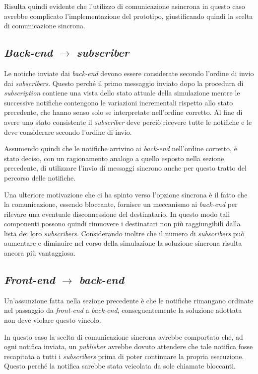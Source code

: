Risulta quindi evidente che l'utilizzo di comunicazione asincrona in questo caso avrebbe complicato l'implementazione del prototipo, giustificando quindi la scelta di comunicazione sincrona.

\subsection*{\textit{Back-end} $\rightarrow$ \textit{subscriber}}
Le notiche inviate dai \textit{back-end} devono essere considerate secondo l'ordine di invio dai \textit{subscribers}. Questo perché il primo messaggio inviato dopo la procedura di \textit{subscription} contiene una vista dello stato attuale della simulazione mentre le successive notifiche contengono le variazioni incrementali rispetto allo stato precedente, che hanno senso solo se interpretate nell'ordine corretto. Al fine di avere uno stato consistente il \textit{subscriber} deve perciò ricevere tutte le notifiche e le deve considerare secondo l'ordine di invio.

Assumendo quindi che le notifiche arrivino ai \textit{back-end} nell'ordine corretto, è stato deciso, con un ragionamento analogo a quello esposto nella sezione precedente, di utilizzare l'invio di messaggi sincrono anche per questo tratto del percorso delle notifiche.

Una ulteriore motivazione che ci ha spinto verso l'opzione sincrona è il fatto che la comunicazione, essendo bloccante, fornisce un meccanismo ai \textit{back-end} per rilevare una eventuale disconnessione del destinatario. In questo modo tali componenti possono quindi rimuovere i destinatari non più raggiungibili dalla lista dei loro \textit{subscribers}. Considerando inoltre che il numero di \textit{subscribers} può aumentare e diminuire nel corso della simulazione la soluzione sincrona risulta ancora più vantaggiosa.

\subsection*{\textit{Front-end} $\rightarrow$ \textit{back-end}}
Un'assunzione fatta nella sezione precedente è che le notifiche rimangano ordinate nel passaggio da \textit{front-end} a \textit{back-end}, conseguentemente la soluzione adottata non deve violare questo vincolo.

In questo caso la scelta di comunicazione sincrona avrebbe comportato che, ad ogni notifica inviata, un \textit{publisher} avrebbe dovuto attendere che tale notifica fosse recapitata a tutti i \textit{subscribers} prima di poter continuare la propria esecuzione. Questo perché la notifica sarebbe stata veicolata da sole chiamate bloccanti.

